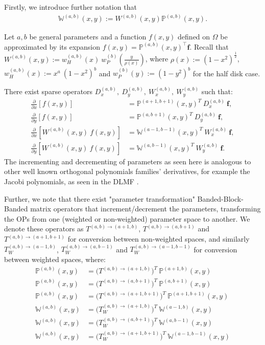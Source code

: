 \documentclass[11pt, oneside]{article}   	%
\newcommand{\half}{\frac{1}{2}}
\newcommand{\bigP}{\mathbb{P}}
\newcommand{\Wab}{{W^{(a,b)}}}
\newcommand{\bigPab}{\bigP^{(a,b)}}
\newcommand{\dx}{\frac{\partial}{\partial x}}
\newcommand{\dy}{\frac{\partial}{\partial y}}
\newcommand{\bigW}{\mathbb{W}}
\newcommand{\bigWab}{\mathbb{W}^{(a,b)}}
\begin{document}
Firstly, we introduce further notation that
\begin{align}
\bigWab(x,y) := \Wab(x,y) \bigPab(x,y).
\end{align}

Let $a, b$ be general parameters and a function $f(x,y)$ defined on $\Omega$ be approximated by its expansion $f(x,y) = \bigPab(x,y)^\top \mathbf{f}$. Recall that $\Wab(x,y) := w_H^{(a,b)}(x) \: w_P^{(b)}(\frac{y}{\rho(x)})$, where $\rho(x) := (1-x^2)^\half$, $w_H^{(a,b)}(x) := x^a \: (1-x^2)^b$ and $w_P^{(b)}(y) := (1-y^2)^b$ for the half disk case.

There exist sparse operators \(D_x^{(a,b)}, \: D_y^{(a,b)}, \: W_x^{(a,b)}, \: W_y^{(a,b)}\) such that:
\begin{align}
\dx[f(x,y)] &= \bigP^{(a+1,b+1)}(x,y)^T \: D_x^{(a,b)} \: \mathbf{f}, \\
\dy[f(x,y)] &= \bigP^{(a,b+1)}(x,y)^T \: D_y^{(a,b)} \: \mathbf{f}, \\
\dx[\Wab(x,y) \: f(x,y)] &= \bigW^{(a-1,b-1)}(x,y)^T \: W_x^{(a,b)} \: \mathbf{f}, \\
\dy[\Wab(x,y) \: f(x,y)] &= \bigW^{(a,b-1)}(x,y)^T \: W_y^{(a,b)} \: \mathbf{f}.
\end{align}
The incrementing and decrementing of parameters as seen here is analogous to other well known orthogonal polynomials families' derivatives, for example the Jacobi polynomials, as seen in the DLMF \cite{DLMFDerivatives}.

Further, we note that there exist "parameter transformation" Banded-Block-Banded matrix operators that increment/decrement the parameters, transforming the OPs from one (weighted or non-weighted) parameter space to another. We denote these operators as $T^{(a,b)\to(a+1,b)}$, $T^{(a,b)\to(a,b+1)}$ and $T^{(a,b)\to(a+1,b+1)}$ for conversion between non-weighted spaces, and similarly $T_W^{(a,b)\to(a-1,b)}$, $T_W^{(a,b)\to(a,b-1)}$ and $T_W^{(a,b)\to(a-1,b-1)}$ for conversion between weighted spaces, where:
\begin{align}
\bigP^{(a,b)}(x,y) &= \Big(T^{(a,b)\to(a+1,b)} \Big)^T \: \bigP^{(a+1,b)}(x,y) \\
\bigP^{(a,b)}(x,y) &= \Big(T^{(a,b)\to(a,b+1)} \Big)^T \: \bigP^{(a,b+1)}(x,y) \\
\bigP^{(a,b)}(x,y) &= \Big(T^{(a,b)\to(a+1,b+1)} \Big)^T \: \bigP^{(a+1,b+1)}(x,y) \\
\bigW^{(a,b)}(x,y) &= \Big(T_W^{(a,b)\to(a+1,b)} \Big)^T \: \bigW^{(a-1,b)}(x,y) \\
\bigW^{(a,b)}(x,y) &= \Big(T_W^{(a,b)\to(a,b+1)} \Big)^T \: \bigW^{(a,b-1)}(x,y) \\
\bigW^{(a,b)}(x,y) &= \Big(T_W^{(a,b)\to(a+1,b+1)} \Big)^T \: \bigW^{(a-1,b-1)}(x,y) \\
\end{align}
\end{document}
